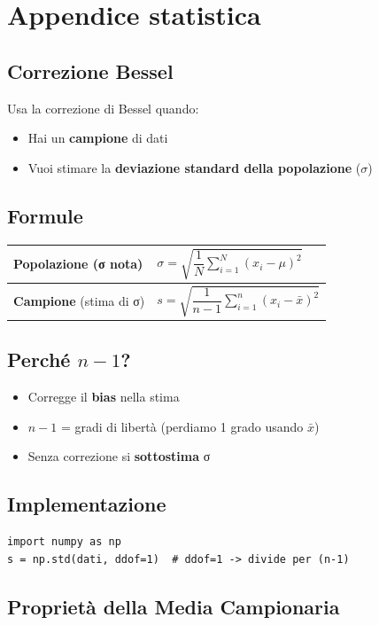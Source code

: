 \documentclass{article}
\begin{document}
\pagebreak

\section*{Appendice statistica}

\subsection*{Correzione Bessel}
Usa la correzione di Bessel quando:
\begin{itemize}
    \item Hai un \textbf{campione} di dati
    \item Vuoi stimare la \textbf{deviazione standard della popolazione} ($\sigma$)
\end{itemize}

\subsection*{Formule}
\begin{tabular}{|l|l|}
\hline
\textbf{Popolazione} (σ nota) & $\sigma = \sqrt{\dfrac{1}{N}\sum\limits_{i=1}^N (x_i - \mu)^2}$ \\
\hline
\textbf{Campione} (stima di σ) & $s = \sqrt{\dfrac{1}{n-1}\sum\limits_{i=1}^n (x_i - \bar{x})^2}$ \\
\hline
\end{tabular}

\subsection*{Perché $n-1$?}
\begin{itemize}
    \item Corregge il \textbf{bias} nella stima
    \item $n-1$ = gradi di libertà (perdiamo 1 grado usando $\bar{x}$)
    \item Senza correzione si \textbf{sottostima} σ
\end{itemize}

\subsection*{Implementazione}
\begin{lstlisting}
import numpy as np
s = np.std(dati, ddof=1)  # ddof=1 -> divide per (n-1)
\end{lstlisting}

\subsection*{Proprietà della Media Campionaria}
\end{document}
